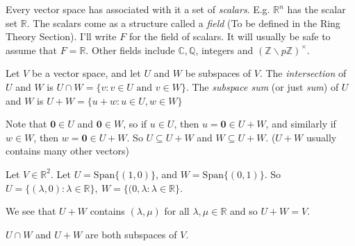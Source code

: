 Every vector space has associated with it a set of \emph{scalars}. E.g. $\mathbb{R}^n$ has the scalar set $\mathbb{R}.$ The scalars come as a structure called a \emph{field} (To be defined in the Ring Theory Section). I'll write $F$ for the field of scalars. It will usually be safe to assume that $F = \mathbb{R}$. Other fields include $\mathbb{C}, \mathbb{Q}$, integers and $(\mathbb{Z}\backslash p \mathbb{Z})^{\times}$.

\begin{definition} Let $V$ be a vector space, and let $U$ and $W$ be subspaces of $V$. The \emph{intersection} of $U$ and $W$ is $U \cap W = \{v: v \in U \text{ and } v \in W\}$. The \emph{subspace sum} (or just \emph{sum}) of $U$ and $W$ is $U + W = \{u + w: u \in U, w \in W\}$
\end{definition}\vspace*{10pt}

\begin{remark}  Note that $\mathbf{0} \in U$ and $\mathbf{0} \in W$, so if $u \in U$, then $u = \mathbf{0} \in U + W$, and similarly if  $w \in W$, then $w = \mathbf{0} \in U + W$. So $U \subseteq U + W$ and $W \subseteq U + W$. ($U+W$ usually contains many other vectors)
\end{remark}\vspace*{10pt}

\begin{example} Let $V \in \mathbb{R}^2.$ Let $U = \text{Span}\{(1,0)\}$, and  $W = \text{Span}\{(0,1)\}$. So $U = \{(\lambda, 0): \lambda \in \mathbb{R}\}, ~W = \{(0,\lambda: \lambda \in \mathbb{R}\}$.

We see that $U + W$ contains $(\lambda, \mu)$ for all $\lambda, \mu \in \mathbb{R}$ and so $U + W = V$.
\end{example}\vspace*{10pt}



\begin{proposition} $U \cap W$ and $U + W$ are both subspaces of $V$. 	
\end{proposition}

